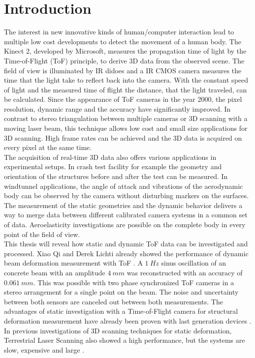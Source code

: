 \section[Introduction]{Introduction}\label{sec:motivation}
The interest in new innovative kinds of human/computer interaction lead to multiple low cost developments to detect the movement of a human body. The Kinect 2, developed by Microsoft, measures the propagation time of light by the Time-of-Flight (ToF) principle, to derive 3D data from the observed scene. The field of view is illuminated by IR didoes and a IR CMOS camera measures the time that the light take to reflect back into the camera. With the constant speed of light and the measured time of flight the distance, that the light traveled, can be calculated.  Since the appearance of ToF cameras in the year 2000, the pixel resolution, dynamic range and the accuracy have significantly improved. In contrast to stereo triangulation between multiple cameras or 3D scanning with a moving laser beam, this technique allows low cost and small size applications for 3D scanning. High frame rates can be achieved and the 3D data is acquired on every pixel at the same time.\\

 The acquisition of real-time 3D data also offers various applications in experimental setups. In crash test facility for example the geometry and orientation of the structures before and after the test can be measured. In windtunnel applications, the angle of attack and vibrations of the aerodynamic body can be observed by the camera without disturbing markers on the surfaces. The measurement of the static geometries and the dynamic behavior delivers a way to merge data between different calibrated camera systems in a common set of data. Aeroelasticity investigations are possible on the complete body in every point of the field of view.\\

 This thesis will reveal how static and dynamic ToF data can be investigated and processed. Xiao Qi and Derek Lichti already showed the performance of dynamic beam deformation measurement with ToF \cite{qi2014structural}. A $1~Hz$ sinus oscillation of an concrete beam with an amplitude $4~mm$ was reconstructed with an accuracy of $0.061~mm$. This was possible with two phase synchronized ToF cameras in a stereo arrangement for a single point on the beam. The noise and uncertainty between both sensors are canceled out between both measurements. The advantages of static investigation with a Time-of-Flight camera for structural deformation measurement have already been proven with last generation devices \cite{jamtsho2010geometric}. In previous investigations of 3D scanning techniques for static deformation, Terrestrial Laser Scanning also showed a high performance, but the systems are slow, expensive and large \cite{park2007new}.\\
    
